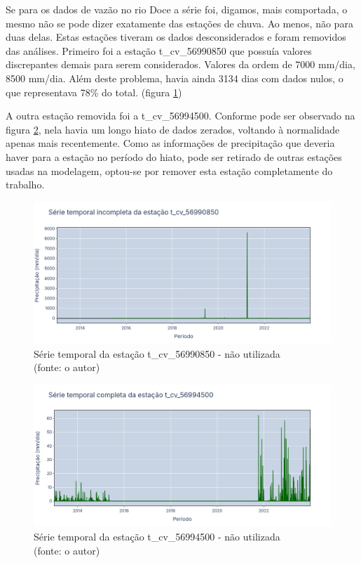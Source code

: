Se para os dados de vazão no rio Doce a série foi, digamos, mais comportada, o mesmo não se pode dizer exatamente das estações de chuva. Ao menos, não para duas delas. Estas estações tiveram os dados desconsiderados e foram removidos das análises. Primeiro foi a estação t\_cv\_56990850 que possuía valores discrepantes demais para serem considerados. Valores da ordem de 7000 mm/dia, 8500 mm/dia. Além deste problema, havia ainda 3134 dias com dados nulos, o que representava 78\% do total. (figura \ref{fig:doceSerieIncompleta_t_cv_56990850})

A outra estação removida foi a t\_cv\_56994500. Conforme pode ser observado na figura \ref{fig:doceSerieCompleta_t_cv_56994500}, nela havia um longo hiato de dados zerados, voltando à normalidade apenas mais recentemente. Como as informações de precipitação que deveria haver para a estação no período do hiato, pode ser retirado de outras estações usadas na modelagem, optou-se por remover esta estação completamente do trabalho.

\begin{figure}[!h]
	\centering
	\includegraphics[scale=0.25]{Figuras/rio_doce/doceSerieIncompleta_t_cv_56990850.png}
	\caption{Série temporal da estação t\_cv\_56990850 - não utilizada\\(fonte: o autor)}
	\label{fig:doceSerieIncompleta_t_cv_56990850}
\end{figure}

\begin{figure}[!h]
	\centering
	\includegraphics[scale=0.25]{Figuras/rio_doce/doceSerieCompleta_t_cv_56994500.png}
	\caption{Série temporal da estação t\_cv\_56994500 - não utilizada\\(fonte: o autor)}
	\label{fig:doceSerieCompleta_t_cv_56994500}
\end{figure}

